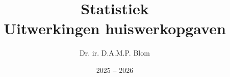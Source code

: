 \documentclass[a4paper, 12pt, twoside]{memoir}
\title{Statistiek \\ Uitwerkingen huiswerkopgaven}
\author{Dr. ir. D.A.M.P. Blom}
\date{2025 -- 2026}
\newcommand{\path}{C:/Users/Admin/Documents/GitHub/Statistiek}
\begin{document}
\OnehalfSpacing
\frontmatter                %

\tableofcontents

\mainmatter



\backmatter


 
\end{document}
